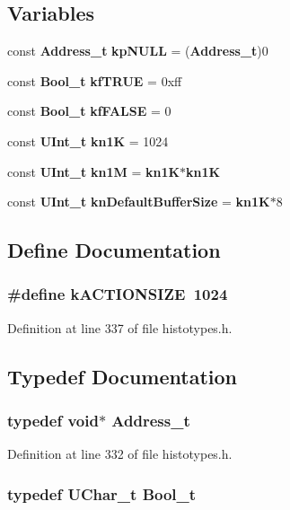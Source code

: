\subsection*{Variables}
\begin{CompactItemize}
\item 
const {\bf Address\_\-t} {\bf kp\-NULL} = ({\bf Address\_\-t})0
\item 
const {\bf Bool\_\-t} {\bf kf\-TRUE} = 0xff
\item 
const {\bf Bool\_\-t} {\bf kf\-FALSE} = 0
\item 
const {\bf UInt\_\-t} {\bf kn1K} = 1024
\item 
const {\bf UInt\_\-t} {\bf kn1M} = {\bf kn1K}$\ast${\bf kn1K}
\item 
const {\bf UInt\_\-t} {\bf kn\-Default\-Buffer\-Size} = {\bf kn1K}$\ast$8
\end{CompactItemize}


\subsection{Define Documentation}
\subsubsection{\setlength{\rightskip}{0pt plus 5cm}\#define k\-ACTIONSIZE\ 1024}\label{histotypes_8h_a0}




Definition at line 337 of file histotypes.h.

\subsection{Typedef Documentation}
\subsubsection{\setlength{\rightskip}{0pt plus 5cm}typedef void$\ast$ Address\_\-t}\label{histotypes_8h_a13}




Definition at line 332 of file histotypes.h.
\subsubsection{\setlength{\rightskip}{0pt plus 5cm}typedef {\bf UChar\_\-t} Bool\_\-t}\label{histotypes_8h_a15}




